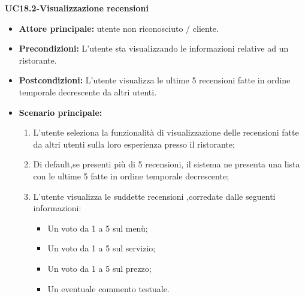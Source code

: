 \textbf{UC18.2-Visualizzazione recensioni}
\begin{itemize}
\item \textbf{Attore principale:} utente non riconosciuto / cliente.
\item \textbf{Precondizioni:} L'utente sta visualizzando le informazioni relative ad un ristorante.
\item \textbf{Postcondizioni:} L'utente visualizza le ultime 5 recensioni fatte in ordine temporale decrescente da altri utenti.
\item \textbf{Scenario principale:}
\begin{enumerate}
    \item L'utente seleziona la funzionalità di visualizzazione delle recensioni fatte da altri utenti
    sulla loro esperienza presso il ristorante;
    \item Di default,se presenti più di 5 recensioni, il sistema ne presenta una lista con le ultime 5 fatte in ordine temporale decrescente;
    \item L'utente visualizza le suddette recensioni ,corredate dalle seguenti informazioni:
    \begin{itemize}
        \item Un voto da 1 a 5 sul menù;
        \item Un voto da 1 a 5 sul servizio;
        \item Un voto da 1 a 5 sul prezzo;
        \item Un eventuale commento testuale.
    \end{itemize}
\end{enumerate}
\end{itemize}
